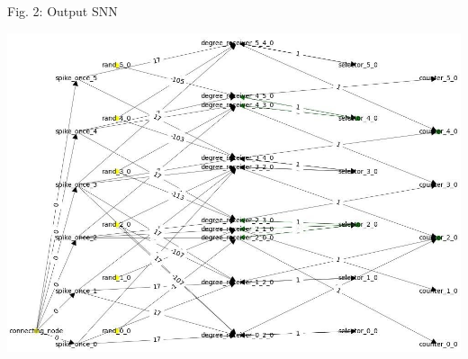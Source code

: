 \begin{rudifig}{\hsize}{Fig. 2: Output SNN}
    
    \hspace{-1em}
    \includegraphics[width=\linewidth]{latex/Images/cropped.jpeg}
    \label{fig:encoded_snn}
\end{rudifig}


